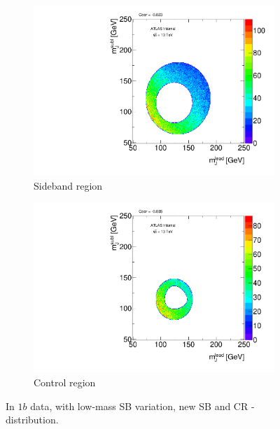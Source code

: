 \begin{figure}[htbp!]
\centering
\captionsetup{justification=centering}
    \begin{subfigure}[b]{0.39\textwidth}
        \includegraphics[width=\textwidth,angle=-90]{figures/boosted/Syst_CRSB/SB_Low_Sideband_OneTag_mH0H1.pdf}
        \caption{Sideband region}
        \label{CRSB:SB_Low_SB}
    \end{subfigure}
    \quad
    \begin{subfigure}[b]{0.39\textwidth}
        \includegraphics[width=\textwidth,angle=-90]{figures/boosted/Syst_CRSB/SB_Low_Control_OneTag_mH0H1.pdf}
        \caption{Control region}
        \label{CRSB:SB_Low_CR}
    \end{subfigure}
\caption{In $1b$ data, with low-mass SB variation, new SB and CR \mleadJ-\msublJ distribution.}
\label{CRSB:SB_Low}
\end{figure}


